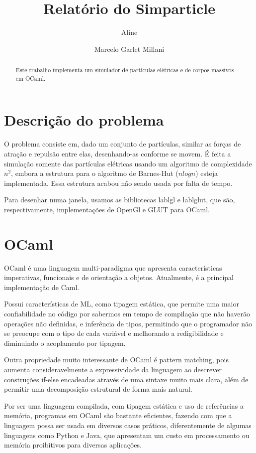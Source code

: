 \documentclass[a4paper,10pt]{article}
\title{Relatório do Simparticle}
\author{Aline \and Marcelo Garlet Millani}
\begin{document}
\maketitle

\begin{abstract}
 Este trabalho implementa um simulador de partículas elétricas e de corpos massivos em OCaml.
\end{abstract}

\section{Descrição do problema}

	O problema consiste em, dado um conjunto de partículas, similar as forças de atração e repulsão entre elas, desenhando-as conforme se movem. É feita a simulação somente das partículas elétricas usando um algoritmo de complexidade $n^2$, embora a estrutura para o algoritmo de Barnes-Hut ($n log n$) esteja implementada. Essa estrutura acabou não sendo usada por falta de tempo.
	
	Para desenhar numa janela, usamos as bibliotecas lablgl e lablglut, que são, respectivamente, implementações de OpenGl e GLUT para OCaml.
	
\section{OCaml}

	OCaml é uma linguagem multi-paradigma que apresenta características imperativas, funcionais e de orientação a objetos. Atualmente, é a principal implementação de Caml.
	
	Possui características de ML, como tipagem estática, que permite uma maior confiabilidade no código por sabermos em tempo de compilação que não haverão operações não definidas, e inferência de tipos, permitindo que o programador não se preocupe com o tipo de cada variável e melhorando a redigibilidade e diminuindo o acoplamento por tipagem.
	
	Outra propriedade muito interessante de OCaml é pattern matching, pois aumenta consideravelmente a expressividade da linguagem ao descrever construções if-else encadeadas através de uma sintaxe muito mais clara, além de permitir uma decomposição estrutural de forma mais natural.
	
	Por ser uma linguagem compilada, com tipagem estática e uso de referências a memória, programas em OCaml são bastante eficientes, fazendo com que a linguagem possa ser usada em diversos casos práticos, diferentemente de algumas linguagens como Python e Java, que apresentam um custo em processamento ou memória proibitivos para diversas aplicações.
	
\end{document}
